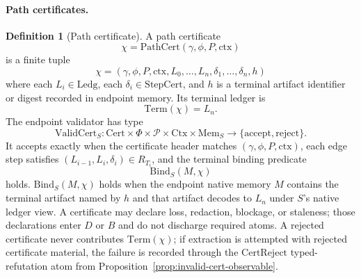 \documentclass[11pt,twoside]{article}
\theoremstyle{definition}
\newtheorem{definition}[theorem]{Definition}
\newcommand{\PathCert}{\mathrm{PathCert}}
\newcommand{\ValidCert}{\mathrm{ValidCert}}
\newcommand{\CertReject}{\mathrm{CertReject}}
\newcommand{\Bind}{\mathrm{Bind}}
\newcommand{\Term}{\mathrm{Term}}
\newcommand{\Ledg}{\mathrm{Ledg}}
\newcommand{\Mem}{\mathrm{Mem}}
\newcommand{\ctx}{\mathrm{ctx}}
\begin{document}
\paragraph{Path certificates.}
\begin{definition}[Path certificate]
A path certificate
\[
  \chi=\PathCert(\gamma,\phi,P,\ctx)
\]
is a finite tuple
\[
  \chi=(\gamma,\phi,P,\ctx,L_0,\ldots,L_n,\delta_1,\ldots,\delta_n,h)
\]
where each $L_i\in\Ledg$, each $\delta_i\in\mathrm{StepCert}$, and $h$ is a
terminal artifact identifier or digest recorded in endpoint memory. Its terminal
ledger is
\[
  \Term(\chi)=L_n.
\]
The endpoint validator has type
\[
  \ValidCert_S:
  \mathrm{Cert}\times\Phi\times\mathcal P\times\mathrm{Ctx}\times\Mem_S
  \to \{\mathrm{accept},\mathrm{reject}\}.
\]
It accepts exactly when the certificate header matches $(\gamma,\phi,P,\ctx)$,
each edge step satisfies $(L_{i-1},L_i,\delta_i)\in R_{T_i}$, and the terminal
binding predicate
\[
  \Bind_S(M,\chi)
\]
holds. $\Bind_S(M,\chi)$ holds when the endpoint native memory $M$ contains the
terminal artifact named by $h$ and that artifact decodes to $L_n$ under
$S$'s native ledger view. A certificate may declare loss, redaction, blockage,
or staleness; those declarations enter $D$ or $B$ and do not discharge required
atoms. A rejected certificate never contributes $\Term(\chi)$; if extraction is
attempted with rejected certificate material, the failure is recorded through
the $\CertReject$ typed-refutation atom from Proposition~\ref{prop:invalid-cert-observable}.
\end{definition}
\end{document}
